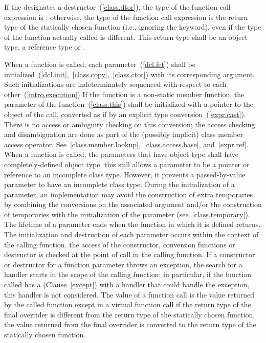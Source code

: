 \pnum
If the  designates a destructor~(\ref{class.dtor}),
the type of the function call expression is ; otherwise, the
type of the function call expression is the return type of the
statically chosen function (i.e., ignoring the  keyword),
even if the type of the function actually called is different.
%
This return type shall be an object type, a reference type or \cv{}
.

\pnum
{}%
%
%
When a function is called, each parameter~(\ref{dcl.fct}) shall be
initialized~(\ref{dcl.init},~\ref{class.copy},~\ref{class.ctor}) with
its corresponding argument.
\enternote Such initializations are indeterminately sequenced
with respect to each other~(\ref{intro.execution}) \exitnote
If the function is a non-static member
function, the  parameter of the function~(\ref{class.this})
shall be initialized with a pointer to the object of the call, converted
as if by an explicit type conversion~(\ref{expr.cast}).
\enternote 
There is no access or ambiguity checking on this conversion; the access
checking and disambiguation are done as part of the (possibly implicit)
class member access operator.
See~\ref{class.member.lookup},~\ref{class.access.base},
and~\ref{expr.ref}.
\exitnote 
When a function is called, the parameters that have object type shall
have completely-defined object type.
\enternote 
this still allows a parameter to be a pointer or reference to an
incomplete class type. However, it prevents a passed-by-value parameter
to have an incomplete class type.
\exitnote 
During the initialization of a parameter, an implementation may avoid
the construction of extra temporaries by combining the conversions on
the associated argument and/or the construction of temporaries with the
initialization of the parameter (see~\ref{class.temporary}). The
lifetime of a parameter ends when the function in which it is defined
returns. The initialization and destruction of each parameter occurs
within the context of the calling function.
\enterexample 
the access of the constructor, conversion functions or destructor is
checked at the point of call in the calling function. If a constructor
or destructor for a function parameter throws an exception, the search
for a handler starts in the scope of the calling function; in
particular, if the function called has a 
(Clause~\ref{except}) with a handler that could handle the exception,
this handler is not considered.
\exitexample 
The value of a function call is the value returned by the called
function except in a virtual function call if the return type of the
final overrider is different from the return type of the statically
chosen function, the value returned from the final overrider is
converted to the return type of the statically chosen function.

